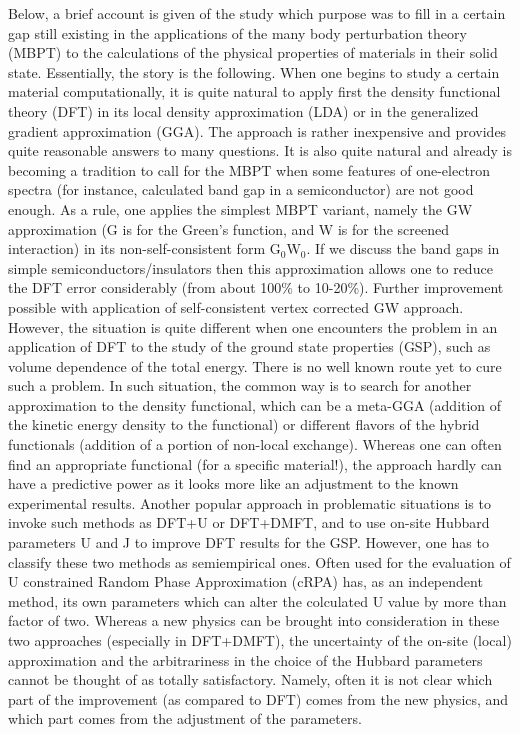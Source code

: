\documentclass[aps,prb,floatfix,epsfig,twocolumn,preprintnumbers]{revtex4}
\begin{document}
Below, a brief account is given of the study which purpose was to fill in a certain gap still existing in the applications of the many body perturbation theory (MBPT) to the calculations of the physical properties of materials in their solid state. Essentially, the story is the following. When one begins to study a certain material computationally, it is quite natural to apply first the density functional theory (DFT\cite{pr_136_B864,pr_140_1133}) in its local density approximation (LDA\cite{prl_45_566,cjp_58_1200}) or in the generalized gradient approximation (GGA\cite{prb_33_8800,prl_77_3865}). The approach is rather inexpensive and provides quite reasonable answers to many questions. It is also quite natural and already is becoming a tradition to call for the MBPT when some features of one-electron spectra (for instance, calculated band gap in a semiconductor) are not good enough. As a rule, one applies the simplest MBPT variant, namely the GW approximation (G is for the Green's function, and W is for the screened interaction) in its non-self-consistent form G$_{0}$W$_{0}$.\cite{pr_139_A796,prb_34_5390} If we discuss the band gaps in simple semiconductors/insulators then this approximation allows one to reduce the DFT error considerably (from about 100\% to 10-20\%\cite{prb_93_115203}). Further improvement possible with application of self-consistent vertex corrected GW approach.\cite{prb_95_195120} However, the situation is quite different when one encounters the problem in an application of DFT to the study of the ground state properties (GSP), such as volume dependence of the total energy. There is no well known route yet to cure such a problem. In such situation, the common way is to search for another approximation to the density functional, which can be a meta-GGA\cite{prl_91_146401,prl_103_026403,jcp_125_194101} (addition of the kinetic energy density to the functional) or different flavors of the hybrid functionals\cite{jcp_110_6158,jcp_98_5648,jcp_125_224106,jctc_9_1631} (addition of a portion of non-local exchange). Whereas one can often find an appropriate functional (for a specific material!), the approach hardly can have a predictive power as it looks more like an adjustment to the known experimental results.\cite{jctc_10_3832} Another popular approach in problematic situations is to invoke such methods as DFT+U\cite{prb_48_16929} or DFT+DMFT,\cite{rmp_68_13} and to use on-site Hubbard parameters U and J to improve DFT results for the GSP. However, one has to classify these two methods as semiempirical ones. Often used for the evaluation of U constrained Random Phase Approximation\cite{prb_70_195104} (cRPA) has, as an independent method, its own parameters which can alter the colculated U value by more than factor of two.\cite{prb_82_045105} Whereas a new physics can be brought into consideration in these two approaches (especially in DFT+DMFT), the uncertainty of the on-site (local) approximation and the arbitrariness in the choice of the Hubbard parameters cannot be thought of as totally satisfactory. Namely, often it is not clear which part of the improvement (as compared to DFT) comes from the new physics, and which part comes from the adjustment of the parameters. 
\end{document}
